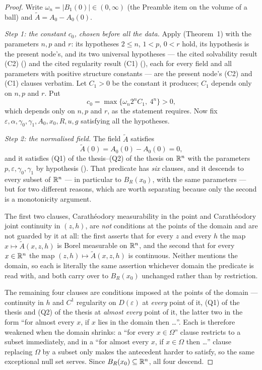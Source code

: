 \begin{proof}
Write $\omega_n=|B_1(0)|\in(0,\infty)$ (the Preamble item on the volume of a
ball) and $\widetilde A=A_0-A_0(0)$.

\emph{Step 1: the constant $c_0$, chosen before all the data.}  Apply
 (Theorem~1) with the parameters $n,p$ and $r$:
its hypotheses $2\le n$, $1<p$, $0<r$ hold, its hypothesis
 is the present node's, and its two universal
hypotheses --- the cited solvability result (C2) ()
and the cited regularity result (C1) (), each
for every field and all parameters with positive structure constants --- are
the present node's (C2) and (C1) clauses verbatim.  Let $C_1>0$ be the
constant it produces; $C_1$ depends only on $n,p$ and $r$.  Put
\[
c_0=\max\{\omega_n2^nC_1,\ 4^n\}>0 ,
\]
which depends only on $n,p$ and $r$, as the statement requires.  Now fix
$\varepsilon,\alpha,\gamma_0,\gamma_1,A_0,x_0,R,u,g$ satisfying all the
hypotheses.

\emph{Step 2: the normalised field.}  The field $\widetilde A$ satisfies
\[
\widetilde A(0)=A_0(0)-A_0(0)=0 ,
\]
and it satisfies (Q1) of the thesis--(Q2) of the thesis on $\mathbb{R}^n$ with the parameters
$p,\varepsilon,\gamma_0,\gamma_1$ by hypothesis
().  That predicate has \emph{six} clauses, and it
descends to every subset of $\mathbb{R}^n$ --- in particular to $B_R(x_0)$, with the
same parameters --- but for two different reasons, which are worth separating
because only the second is a monotonicity argument.

The first two clauses, Carath\'eodory measurability in the point and
Carath\'eodory joint continuity in $(z,h)$, are \emph{not} conditions at the
points of the domain and are not guarded by it at all: the first asserts that
for every $z$ and every $h$ the map $x\mapsto\widetilde A(x,z,h)$ is Borel
measurable on $\mathbb{R}^n$, and the second that for every $x\in\mathbb{R}^n$ the map
$(z,h)\mapsto\widetilde A(x,z,h)$ is continuous.  Neither mentions the domain,
so each is literally the same assertion whichever domain the predicate is read
with, and both carry over to $B_R(x_0)$ unchanged rather than by restriction.

The remaining four clauses are conditions imposed at the points of the domain
--- continuity in $h$ and $C^1$ regularity on $D(\varepsilon)$ at \emph{every}
point of it, (Q1) of the thesis and (Q2) of the thesis at \emph{almost every} point of it,
the latter two in the form ``for almost every $x$, if $x$ lies in the domain
then \dots''.  Each is therefore weakened when the domain shrinks: a ``for every
$x\in\Omega$'' clause restricts to a subset immediately, and in a ``for almost
every $x$, if $x\in\Omega$ then \dots'' clause replacing $\Omega$ by a subset
only makes the antecedent harder to satisfy, so the same exceptional null set
serves.  Since $B_R(x_0)\subseteq\mathbb{R}^n$, all four descend.


\end{proof}
